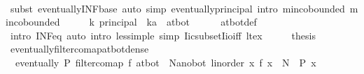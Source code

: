 \begin{isabellebody}
\ \ \ \ \isamarkupfalse%
\ {\isacharparenleft}{\kern0pt}subst\ eventually{\isacharunderscore}{\kern0pt}INF{\isacharunderscore}{\kern0pt}base{\isacharparenright}{\kern0pt}\ {\isacharparenleft}{\kern0pt}auto\ simp{\isacharcolon}{\kern0pt}\ eventually{\isacharunderscore}{\kern0pt}principal\ intro{\isacharcolon}{\kern0pt}\ min{\isachardot}{\kern0pt}cobounded{}\ min{\isachardot}{\kern0pt}cobounded{}{\isacharparenright}{\kern0pt}\isanewline
\ \ \isamarkupfalse%
\ \isamarkupfalse%
\ {\isachardoublequoteopen}{\isacharparenleft}{\kern0pt}{\isasymSqinter}k{\isachardot}{\kern0pt}\ principal\ {\isacharbraceleft}{\kern0pt}{\isachardot}{\kern0pt}{\isachardot}{\kern0pt}{\isacharless}{\kern0pt}\ k{\isacharcolon}{\kern0pt}{\isacharcolon}{\kern0pt}{\isacharprime}{\kern0pt}a{\isacharbraceright}{\kern0pt}{\isacharparenright}{\kern0pt}\ {\isacharequal}{\kern0pt}\ at{\isacharunderscore}{\kern0pt}bot{\isachardoublequoteclose}\isanewline
\ \ \ \ \isamarkupfalse%
\ at{\isacharunderscore}{\kern0pt}bot{\isacharunderscore}{\kern0pt}def\isanewline
\ \ \ \ \isamarkupfalse%
\ {\isacharparenleft}{\kern0pt}intro\ INF{\isacharunderscore}{\kern0pt}eq{\isacharparenright}{\kern0pt}\ {\isacharparenleft}{\kern0pt}auto\ intro{\isacharcolon}{\kern0pt}\ less{\isacharunderscore}{\kern0pt}imp{\isacharunderscore}{\kern0pt}le\ simp{\isacharcolon}{\kern0pt}\ Iic{\isacharunderscore}{\kern0pt}subset{\isacharunderscore}{\kern0pt}Iio{\isacharunderscore}{\kern0pt}iff\ lt{\isacharunderscore}{\kern0pt}ex{\isacharparenright}{\kern0pt}\isanewline
\ \ \isamarkupfalse%
\ \isamarkupfalse%
\ {\isacharquery}{\kern0pt}thesis\ \isacommand{{\isachardot}{\kern0pt}}\isamarkupfalse%
\isanewline
{}\isamarkupfalse%
%
\endisatagproof
{\isafoldproof}%
%
\isadelimproof
\isanewline
%
\endisadelimproof
\isanewline
{}\isamarkupfalse%
\ eventually{\isacharunderscore}{\kern0pt}filtercomap{\isacharunderscore}{\kern0pt}at{\isacharunderscore}{\kern0pt}bot{\isacharunderscore}{\kern0pt}dense{\isacharcolon}{\kern0pt}\ \isanewline
\ \ {\isachardoublequoteopen}eventually\ P\ {\isacharparenleft}{\kern0pt}filtercomap\ f\ at{\isacharunderscore}{\kern0pt}bot{\isacharparenright}{\kern0pt}\ {\isasymlongleftrightarrow}\ {\isacharparenleft}{\kern0pt}{\isasymexists}N{\isacharcolon}{\kern0pt}{\isacharcolon}{\kern0pt}{\isacharprime}{\kern0pt}a{\isacharcolon}{\kern0pt}{\isacharcolon}{\kern0pt}{\isacharbraceleft}{\kern0pt}no{\isacharunderscore}{\kern0pt}bot{\isacharcomma}{\kern0pt}\ linorder{\isacharbraceright}{\kern0pt}{\isachardot}{\kern0pt}\ {\isasymforall}x{\isachardot}{\kern0pt}\ f\ x\ {\isacharless}{\kern0pt}\ N\ {\isasymlongrightarrow}\ P\ x{\isacharparenright}{\kern0pt}{\isachardoublequoteclose}\isanewline

\end{isabellebody}

